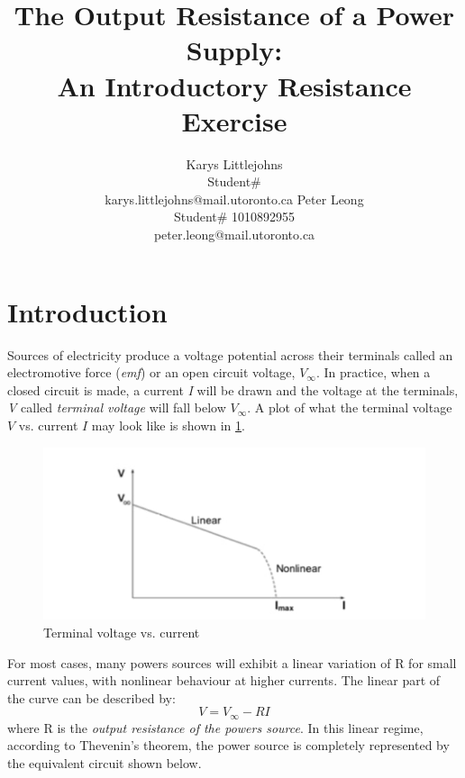 \documentclass{article} %
\title{The Output Resistance of a Power Supply: \\
An Introductory Resistance Exercise}
\author{Karys Littlejohns\\
Student\# \\
karys.littlejohns@mail.utoronto.ca
\And
Peter Leong \\
Student\# 1010892955 \\
peter.leong@mail.utoronto.ca \\
\AND
}
\begin{document}
\maketitle

\vspace{-6ex}




\section{Introduction}

Sources of electricity produce a voltage potential across their terminals called an electromotive force (\textit{emf}) or an open circuit voltage, $V_{\infty}$.
In practice, when a closed circuit is made, a current \textit{I} will be drawn and the voltage at the terminals, \textit{V} called \textit{terminal voltage} will fall below $V_{\infty}$.
A plot of what the terminal voltage $V$ vs. current $I$ may look like is shown in \ref{fig:terminal_voltage_vs_current}.

\begin{figure}[htbp]            %
  \centering
  \includegraphics[width=0.65\linewidth]{Figs/terminal_voltage_current_linear.jpg}
  \caption{Terminal voltage vs. current}
  \label{fig:terminal_voltage_vs_current}
\end{figure}

For most cases, many powers sources will exhibit a linear variation of R for small current values, with nonlinear behaviour at higher currents.
The linear part of the curve can be described by:
\[
V = V_{\infty} - RI
\]
where R is the \textit{output resistance of the powers source}.
In this linear regime, according to Thevenin's theorem, the power source is completely represented by the equivalent circuit shown below.
\end{document}
